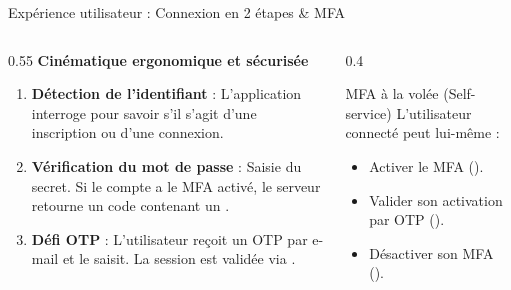 \documentclass[10pt,aspectratio=169]{beamer}
\begin{document}
\begin{frame}{Expérience utilisateur : Connexion en 2 étapes \& MFA}
  \begin{columns}[T]
    \begin{column}{0.55\textwidth}
      \textbf{Cinématique ergonomique et sécurisée}
      \begin{enumerate}
        \item \textbf{Détection de l'identifiant} : L'application interroge  pour savoir s'il s'agit d'une inscription ou d'une connexion.
        \item \textbf{Vérification du mot de passe} : Saisie du secret. Si le compte a le MFA activé, le serveur retourne un code  contenant un .
        \item \textbf{Défi OTP} : L'utilisateur reçoit un OTP par e-mail et le saisit. La session est validée via .
      \end{enumerate}
    \end{column}
    \begin{column}{0.4\textwidth}
      \begin{block}{MFA à la volée (Self-service)}
        L'utilisateur connecté peut lui-même :
        \begin{itemize}
          \item Activer le MFA ().
          \item Valider son activation par OTP ().
          \item Désactiver son MFA ().
        \end{itemize}
      \end{block}
    \end{column}
  \end{columns}
\end{frame}
\end{document}
